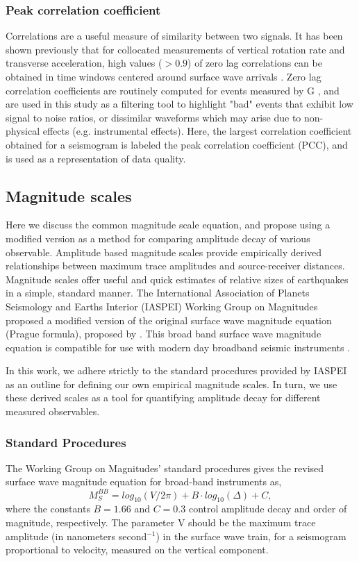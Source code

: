 \documentclass{gji}
\begin{document}
\subsubsection{Peak correlation coefficient}
Correlations are a useful measure of similarity between two signals. It has been shown previously that for collocated measurements of vertical rotation rate and transverse acceleration, high values ($>0.9$) of zero lag correlations can be obtained in time windows centered around surface wave arrivals \cite{igel2007broad}.
Zero lag correlation coefficients are routinely computed for events measured by G \cite{salvermoser2017event},
and are used in this study as a filtering tool to highlight "bad" events that exhibit low signal to noise ratios, or dissimilar waveforms which may arise due to non-physical effects (e.g. instrumental effects). Here, the largest correlation coefficient obtained for a seismogram is labeled the peak correlation coefficient (PCC), and is used as a representation of data quality.


\subsection{Magnitude scales}
Here we discuss the common magnitude scale equation, and propose using a modified version as a method for comparing amplitude decay of various observable. Amplitude based magnitude scales provide empirically derived relationships between maximum trace amplitudes and source-receiver distances. Magnitude scales offer useful and quick estimates of relative sizes of earthquakes in a simple, standard  manner. 
The International Association of Planets Seismology and Earths Interior (IASPEI) Working Group on Magnitudes proposed a modified version of the original surface wave magnitude equation (Prague formula), proposed by \cite{karnik1962standardization}.
This broad band surface wave magnitude equation is compatible for use with modern day broadband seismic instruments \cite{bormann2000new}.

In this work, we adhere strictly to the standard procedures provided by IASPEI as an outline for defining our own empirical magnitude scales. In turn, we use these derived scales as a tool for quantifying amplitude decay for different measured observables.

\subsubsection{Standard Procedures}\label{standproc}
The Working Group on Magnitudes' standard procedures gives the revised surface wave magnitude equation for broad-band instruments as,
\begin{equation}\label{eq:mag}
	M_S^{BB} = log_{10}(V/2\pi) + B\cdot log_{10}(\Delta) + C, 
\end{equation}
where the constants $B=1.66$ and $C=0.3$ control amplitude decay and order of magnitude, respectively. The parameter V should be the maximum trace amplitude (in nanometers second$^{-1}$) in the surface wave train, for a seismogram proportional to velocity, measured on the vertical component. 
\end{document}
